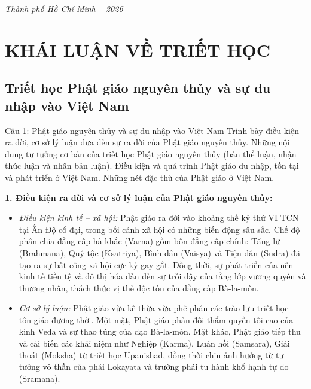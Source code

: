 \documentclass[12pt,a4paper]{article}
\begin{document}
\begin{titlepage}
    \vfill
    {\fontsize{13}{16}\selectfont \textit{Thành phố Hồ Chí Minh -- 2026}}
    \vspace{0.5cm}
    \restoregeometry
\end{titlepage}

\newpage
\tableofcontents
\newpage

\section{KHÁI LUẬN VỀ TRIẾT HỌC}

\subsection{Triết học Phật giáo nguyên thủy và sự du nhập vào Việt Nam}

\begin{questionbox}{Câu 1: Phật giáo nguyên thủy và sự du nhập vào Việt Nam}
Trình bày điều kiện ra đời, cơ sở lý luận đưa đến sự ra đời của Phật giáo nguyên thủy. Những nội dung tư tưởng cơ bản của triết học Phật giáo nguyên thủy (bản thể luận, nhận thức luận và nhân bản luận). Điều kiện và quá trình Phật giáo du nhập, tồn tại và phát triển ở Việt Nam. Những nét đặc thù của Phật giáo ở Việt Nam.
\end{questionbox}

\noindent
\textbf{1. Điều kiện ra đời và cơ sở lý luận của Phật giáo nguyên thủy:}
\begin{itemize}
    \item \textit{Điều kiện kinh tế -- xã hội:} Phật giáo ra đời vào khoảng thế kỷ thứ VI TCN tại Ấn Độ cổ đại, trong bối cảnh xã hội có những biến động sâu sắc. Chế độ phân chia đẳng cấp hà khắc (Varna) gồm bốn đẳng cấp chính: Tăng lữ (Brahmana), Quý tộc (Ksatriya), Bình dân (Vaisya) và Tiện dân (Sudra) đã tạo ra sự bất công xã hội cực kỳ gay gắt. Đồng thời, sự phát triển của nền kinh tế tiền tệ và đô thị hóa dẫn đến sự trỗi dậy của tầng lớp vương quyền và thương nhân, thách thức vị thế độc tôn của đẳng cấp Bà-la-môn.
    \item \textit{Cơ sở lý luận:} Phật giáo vừa kế thừa vừa phê phán các trào lưu triết học -- tôn giáo đương thời. Một mặt, Phật giáo phản đối thẩm quyền tối cao của kinh Veda và sự thao túng của đạo Bà-la-môn. Mặt khác, Phật giáo tiếp thu và cải biến các khái niệm như Nghiệp (Karma), Luân hồi (Samsara), Giải thoát (Moksha) từ triết học Upanishad, đồng thời chịu ảnh hưởng từ tư tưởng vô thần của phái Lokayata và trường phái tu hành khổ hạnh tự do (Sramana).
\end{itemize}
\end{document}
